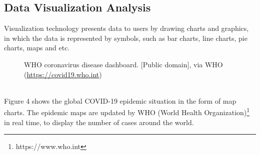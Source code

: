 \documentclass[sigplan,screen]{acmart}
\begin{document}
\subsection{Data Visualization Analysis}
Visualization technology presents data to users by drawing charts and graphics, in which the data is represented by symbols, such as bar charts, line charts, pie charts, maps and etc\cite{jensen1992harvard}.
\begin{figure}[htb]
	\centering
	\caption{WHO coronavirus disease dashboard. [Public domain], via WHO (\url{https://covid19.who.int})}
\end{figure}
\\
Figure 4 shows the global COVID-19 epidemic situation in the form of map charts. The epidemic maps are updated by WHO (World Health Organization)\footnote{https://www.who.int} in real time, to display the number of cases around the world.
\end{document}
